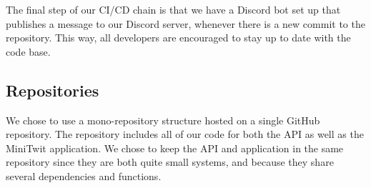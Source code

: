 \begin{itemize}
\begin{itemize}
    \end{itemize}    
\end{itemize}

The final step of our CI/CD chain is that we have a Discord bot set up that publishes a message to our Discord server, whenever there is a new commit to the repository. This way, all developers are encouraged to stay up to date with the code base.

\subsection{Repositories}
We chose to use a mono-repository structure hosted on a single GitHub repository. The repository  includes all of our code for both the API as well as the MiniTwit application. 
We chose to keep the API and application in the same repository since they are both quite small systems, and because they share several dependencies and functions.


